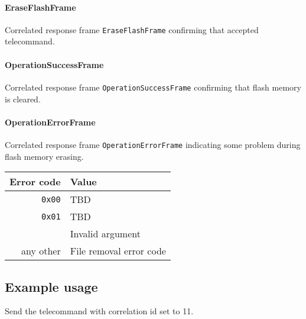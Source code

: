 \paragraph{EraseFlashFrame}
Correlated response frame \texttt{EraseFlashFrame} confirming that \OBC accepted telecommand.

\paragraph{OperationSuccessFrame}
Correlated response frame \texttt{OperationSuccessFrame} confirming that flash memory is cleared.

\paragraph{OperationErrorFrame}
Correlated response frame \texttt{OperationErrorFrame} indicating some problem during flash memory erasing.


\begin{tabular}{r | l}
    Error code & Value \\
    \hline
    \texttt{0x00}   & TBD \\
    \texttt{0x01}   & TBD \\
                    & Invalid argument \\
    any other & File removal error code \\
\end{tabular}


\subsection{Example usage}
Send the telecommand with correlation id set to 11.

